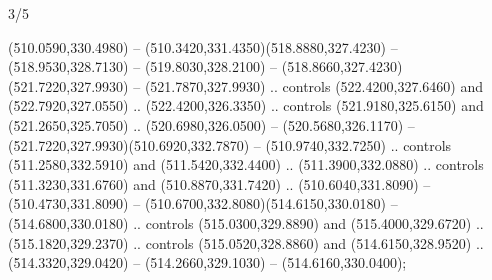\begin{flagdescription}{3/5}
\begin{scope}[shift={(0.5\flaglength,0.5\flagwidth)},scale=\flagwidth/1075]
\begin{scope}[y=0.80pt, x=0.80pt, yscale=-2.37, xscale=2.37,xshift=-402,yshift=-230.4]
  (510.0590,330.4980) -- (510.3420,331.4350)(518.8880,327.4230) --
  (518.9530,328.7130) -- (519.8030,328.2100) --
  (518.8660,327.4230)(521.7220,327.9930) -- (521.7870,327.9930) .. controls
  (522.4200,327.6460) and (522.7920,327.0550) .. (522.4200,326.3350) .. controls
  (521.9180,325.6150) and (521.2650,325.7050) .. (520.6980,326.0500) --
  (520.5680,326.1170) -- (521.7220,327.9930)(510.6920,332.7870) --
  (510.9740,332.7250) .. controls (511.2580,332.5910) and (511.5420,332.4400) ..
  (511.3900,332.0880) .. controls (511.3230,331.6760) and (510.8870,331.7420) ..
  (510.6040,331.8090) -- (510.4730,331.8090) --
  (510.6700,332.8080)(514.6150,330.0180) -- (514.6800,330.0180) .. controls
  (515.0300,329.8890) and (515.4000,329.6720) .. (515.1820,329.2370) .. controls
  (515.0520,328.8860) and (514.6150,328.9520) .. (514.3320,329.0420) --
  (514.2660,329.1030) -- (514.6160,330.0400);
\end{scope}
\end{scope}
\fi
\framecode{}
\end{flagdescription}
